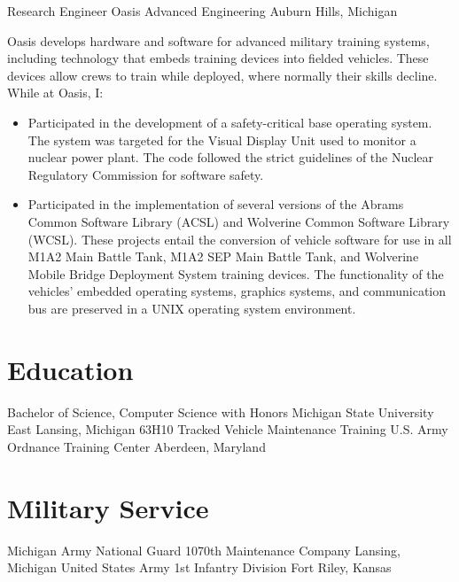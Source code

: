 \documentclass[11pt,letterpaper]{moderncv}
\begin{document}
 {Research Engineer} {Oasis Advanced Engineering}
         {Auburn Hills, Michigan} {}
{
  Oasis develops hardware and software for advanced military training
  systems, including technology that embeds training devices into
  fielded vehicles. These devices allow crews to train while deployed,
  where normally their skills decline.\newline
  While at Oasis, I:
  \begin{itemize}
  \item Participated in the development of a safety-critical base
    operating system. The system was targeted for the Visual Display
    Unit used to monitor a nuclear power plant. The code followed the
    strict guidelines of the Nuclear Regulatory Commission for
    software safety.
  \item Participated in the implementation of several versions of the
    Abrams Common Software Library (ACSL) and Wolverine Common
    Software Library (WCSL). These projects entail the conversion of
    vehicle software for use in all M1A2 Main Battle Tank, M1A2 SEP
    Main Battle Tank, and Wolverine Mobile Bridge Deployment System
    training devices. The functionality of the vehicles' embedded
    operating systems, graphics systems, and communication bus are
    preserved in a UNIX operating system environment.
  \end{itemize}
}


\section{Education}
 {Bachelor of Science, Computer Science with Honors}
         {Michigan State University} {East Lansing, Michigan} {} {}
 {63H10 Tracked Vehicle Maintenance Training}
         {U.S. Army Ordnance Training Center} {Aberdeen, Maryland} {}
         {}

\section{Military Service}
 {Michigan Army National Guard}
         {1070th Maintenance Company} {Lansing, Michigan} {} {}
 {United States Army}
         {1st Infantry Division} {Fort Riley, Kansas} {} {}
\end{document}
